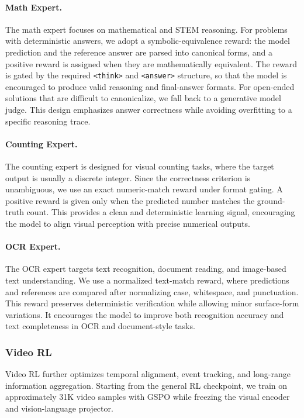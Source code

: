 \documentclass{llmxive}
\begin{document}
\paragraph{Math Expert.}
The math expert focuses on mathematical and STEM reasoning. For problems with deterministic answers, we adopt a symbolic-equivalence reward: the model prediction and the reference answer are parsed into canonical forms, and a positive reward is assigned when they are mathematically equivalent. The reward is gated by the required \texttt{<think>} and \texttt{<answer>} structure, so that the model is encouraged to produce valid reasoning and final-answer formats. For open-ended solutions that are difficult to canonicalize, we fall back to a generative model judge. This design emphasizes answer correctness while avoiding overfitting to a specific reasoning trace.

\paragraph{Counting Expert.}
The counting expert is designed for visual counting tasks, where the target output is usually a discrete integer. Since the correctness criterion is unambiguous, we use an exact numeric-match reward under format gating. A positive reward is given only when the predicted number matches the ground-truth count. This provides a clean and deterministic learning signal, encouraging the model to align visual perception with precise numerical outputs.

\paragraph{OCR Expert.}
The OCR expert targets text recognition, document reading, and image-based text understanding. We use a normalized text-match reward, where predictions and references are compared after normalizing case, whitespace, and punctuation. This reward preserves deterministic verification while allowing minor surface-form variations. It encourages the model to improve both recognition accuracy and text completeness in OCR and document-style tasks.


\subsubsection{Video RL}

Video RL further optimizes temporal alignment, event tracking, and long-range information aggregation. Starting from the general RL checkpoint, we train on approximately 31K video samples with GSPO while freezing the visual encoder and vision-language projector.
\end{document}
